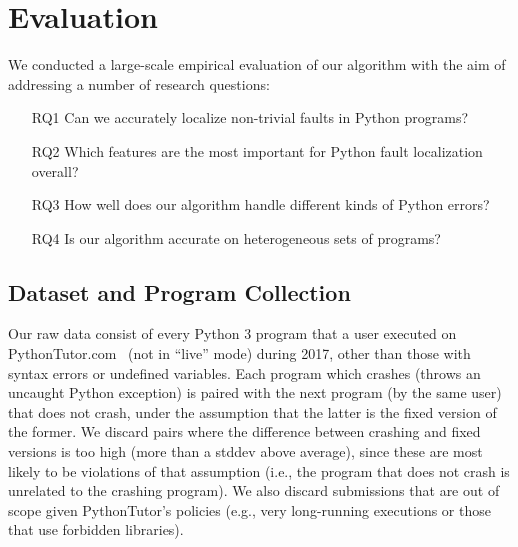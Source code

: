 \documentclass[conference]{IEEEtran}
\begin{document}


\section{Evaluation}
\label{sec-eval}

We conducted a large-scale empirical evaluation of our algorithm with the
aim of addressing a number of research questions:
\begin{enumerate}

\item[RQ1]{Can we accurately localize non-trivial faults in Python
programs?}

\item[RQ2]{Which features are the most important for Python fault
localization overall?}


\item[RQ3]{How well does our algorithm handle different kinds of Python errors?}

\item[RQ4]{Is our algorithm accurate on heterogeneous sets of programs?}

\end{enumerate}

\subsection{Dataset and Program Collection}

Our raw data consist of every Python 3 program that a user executed on
PythonTutor.com~\cite{Guo2013-vu} (not in ``live'' mode) during 2017, other
than those with syntax errors or undefined variables.  Each program which
crashes (throws an uncaught Python exception) is paired with the next
program (by the same user) that does not crash, under the assumption that
the latter is the fixed version of the former. We discard pairs where the
difference between crashing and fixed versions is too high (more than a
stddev above average), since these are most likely to be violations of that
assumption (i.e., the program that does not crash is unrelated to the
crashing program). We also discard submissions that are out of scope given
PythonTutor's policies (e.g., very long-running executions or those that
use forbidden libraries).
\end{document}

